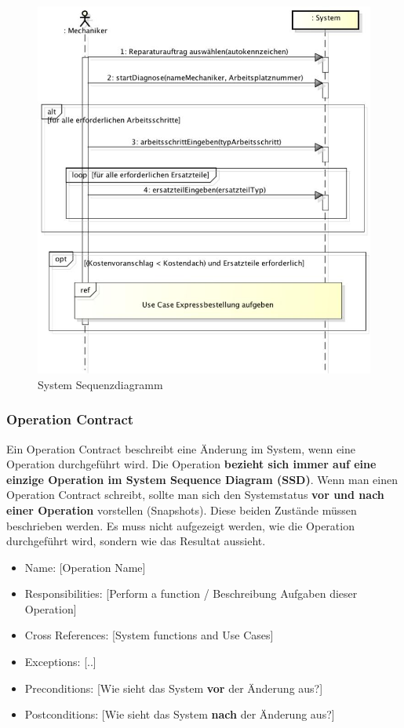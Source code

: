 \begin{figure}[h]
\centering
\includegraphics[width=0.6\linewidth]{images/ssd}
\caption{System Sequenzdiagramm}
\label{fig:ssd}
\end{figure}

\clearpage

\subsubsection{Operation Contract}
Ein Operation Contract beschreibt eine Änderung im System, wenn eine Operation durchgeführt wird. Die Operation \textbf{bezieht sich immer auf eine einzige Operation im System Sequence Diagram (SSD)}. Wenn man einen Operation Contract schreibt, sollte man sich den Systemstatus \textbf{vor und nach einer Operation} vorstellen (Snapshots). Diese beiden Zustände müssen beschrieben werden. Es muss nicht aufgezeigt werden, wie die Operation durchgeführt wird, sondern wie das Resultat aussieht.
\begin{itemize}
	\item Name: [Operation Name]
	\item Responsibilities: [Perform a function / Beschreibung Aufgaben dieser Operation]
	\item Cross References: [System functions and Use Cases]
	\item Exceptions: [..]
	\item Preconditions: [Wie sieht das System \textbf{vor} der Änderung aus?]
	\item Postconditions: [Wie sieht das System \textbf{nach} der Änderung aus?]
\end{itemize}

